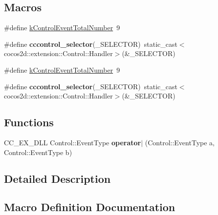 \subsection*{Macros}
\begin{DoxyCompactItemize}
\item 
\#define \hyperlink{group__control__extension_ga0943a168609cb108419ba7f34c64130e}{k\+Control\+Event\+Total\+Number}~9
\item 
\mbox{\label{group__control__extension_ga28eb34ece2b73b97cd9e730693f4a5f8}} 
\#define {\bfseries cccontrol\+\_\+selector}(\+\_\+\+S\+E\+L\+E\+C\+T\+OR)~static\+\_\+cast$<$cocos2d\+::extension\+::\+Control\+::\+Handler$>$(\&\+\_\+\+S\+E\+L\+E\+C\+T\+OR)
\item 
\#define \hyperlink{group__control__extension_ga0943a168609cb108419ba7f34c64130e}{k\+Control\+Event\+Total\+Number}~9
\item 
\mbox{\label{group__control__extension_ga28eb34ece2b73b97cd9e730693f4a5f8}} 
\#define {\bfseries cccontrol\+\_\+selector}(\+\_\+\+S\+E\+L\+E\+C\+T\+OR)~static\+\_\+cast$<$cocos2d\+::extension\+::\+Control\+::\+Handler$>$(\&\+\_\+\+S\+E\+L\+E\+C\+T\+OR)
\end{DoxyCompactItemize}
\subsection*{Functions}
\begin{DoxyCompactItemize}
\item 
\mbox{\label{group__control__extension_ga5a7f7e12f7b938cfd99a8c631d67e22b}} 
C\+C\+\_\+\+E\+X\+\_\+\+D\+LL Control\+::\+Event\+Type {\bfseries operator$\vert$} (Control\+::\+Event\+Type a, Control\+::\+Event\+Type b)
\end{DoxyCompactItemize}


\subsection{Detailed Description}


\subsection{Macro Definition Documentation}
\mbox{\label{group__control__extension_ga0943a168609cb108419ba7f34c64130e}} 
